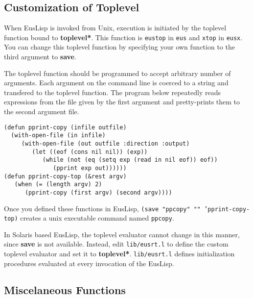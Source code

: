 \subsection{Customization of Toplevel}
When EusLisp is invoked from Unix, execution is initiated by the toplevel
function bound to {\bf *toplevel*}.
This function is {\tt eustop} in {\tt eus} and {\tt xtop} in {\tt eusx}.
You can change this toplevel function by specifying your own 
function to the third argument to {\bf save}. 

The toplevel function should be programmed to accept arbitrary number of
arguments.
Each argument on the command line is coerced to a string and transfered
to the toplevel function.
The program below repeatedly reads expressions from the file given by
the first argument and pretty-prints them to the second argument file.

\begin{verbatim}
(defun pprint-copy (infile outfile)
  (with-open-file (in infile)
     (with-open-file (out outfile :direction :output)
        (let ((eof (cons nil nil)) (exp))
           (while (not (eq (setq exp (read in nil eof)) eof))
              (pprint exp out))))))
(defun pprint-copy-top (&rest argv)
   (when (= (length argv) 2)
      (pprint-copy (first argv) (second argv))))
\end{verbatim}

Once you defined these functions in EusLisp, 
{\tt (save "ppcopy" "" 'pprint-copy-top)} creates a unix executable command
named {\tt ppcopy}. 

In Solaris based EusLisp, the toplevel evaluator cannot change in this
manner, since {\bf save} is not available.
Instead, edit {\tt lib/eusrt.l} to define the custom toplevel evaluator
and set it to {\bf *toplevel*}.
{\tt lib/eusrt.l} defines initialization procedures evaluated
at every invocation of the EusLisp.

\subsection{Miscelaneous Functions}

\begin{refdesc}



\end{refdesc}

\newpage


